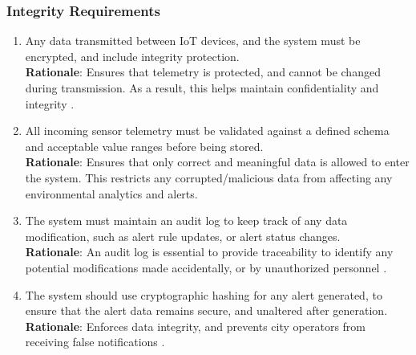 \documentclass[]{article}
\begin{document}
\subsubsection{Integrity Requirements}
\label{ssub:integrity_requirements}
\begin{enumerate}[{SR-INT}1. ]
    \item Any data transmitted between IoT devices, and the system must be encrypted, and include integrity protection. \\
    \textbf{Rationale}: Ensures that telemetry is protected, and cannot be changed during transmission. As a result, this helps maintain confidentiality and integrity \cite{canEncrypt}.
    
	\item All incoming sensor telemetry must be validated against a defined schema and acceptable value ranges before being stored. \\
    \textbf{Rationale}: Ensures that only correct and meaningful data is allowed to enter the system. This restricts any corrupted/malicious data from affecting any environmental analytics and alerts. 

    \item The system must maintain an audit log to keep track of any data modification, such as alert rule updates, or alert status changes. \\
    \textbf{Rationale}: An audit log is essential to provide traceability to identify any potential modifications made accidentally, or by unauthorized personnel \cite{ali2021}.

    \item The system should use cryptographic hashing for any alert generated, to ensure that the alert data remains secure, and unaltered after generation. \\
    \textbf{Rationale}: Enforces data integrity, and prevents city operators from receiving false notifications \cite{canGuid}.
\end{enumerate}
\end{document}
